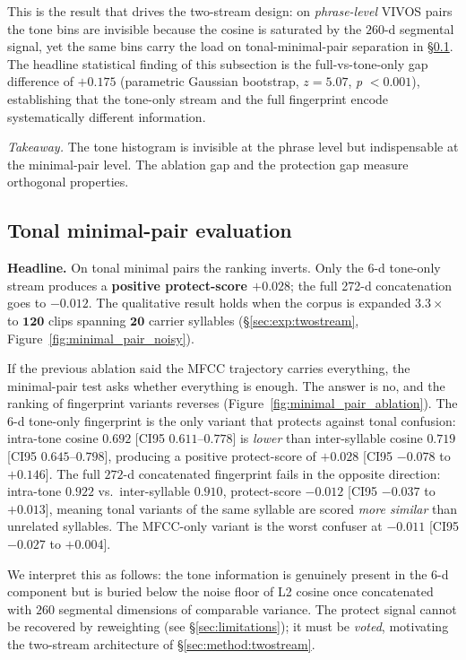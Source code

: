 \documentclass[a4paper,fleqn]{cas-dc}
\begin{document}
This is the result that drives the two-stream design: on \emph{phrase-level} VIVOS pairs the tone bins are invisible because the cosine is saturated by the $260$-d segmental signal, yet the same bins carry the load on tonal-minimal-pair separation in \S\ref{sec:exp:minpair}. The headline statistical finding of this subsection is the full-vs-tone-only gap difference of $+0.175$ (parametric Gaussian bootstrap, $z = 5.07$, \textit{p} $< 0.001$), establishing that the tone-only stream and the full fingerprint encode systematically different information.

\noindent\textit{Takeaway.} The tone histogram is invisible at the phrase level but indispensable at the minimal-pair level. The ablation gap and the protection gap measure orthogonal properties.

\subsection{Tonal minimal-pair evaluation}\label{sec:exp:minpair}
\textbf{Headline.} On tonal minimal pairs the ranking inverts. Only the 6-d tone-only stream produces a \textbf{positive protect-score $+0.028$}; the full 272-d concatenation goes to $-0.012$. The qualitative result holds when the corpus is expanded $\mathbf{3.3\times}$ to $\mathbf{120}$ clips spanning $\mathbf{20}$ carrier syllables (\S\ref{sec:exp:twostream}, Figure~\ref{fig:minimal_pair_noisy}).

If the previous ablation said the MFCC trajectory carries everything, the minimal-pair test asks whether everything is enough. The answer is no, and the ranking of fingerprint variants reverses (Figure~\ref{fig:minimal_pair_ablation}). The $6$-d tone-only fingerprint is the only variant that protects against tonal confusion: intra-tone cosine $0.692$ [CI95 $0.611$--$0.778$] is \emph{lower} than inter-syllable cosine $0.719$ [CI95 $0.645$--$0.798$], producing a positive protect-score of \textbf{$+0.028$} [CI95 $-0.078$ to $+0.146$]. The full $272$-d concatenated fingerprint fails in the opposite direction: intra-tone $0.922$ vs.\ inter-syllable $0.910$, protect-score $-0.012$ [CI95 $-0.037$ to $+0.013$], meaning tonal variants of the same syllable are scored \emph{more similar} than unrelated syllables. The MFCC-only variant is the worst confuser at $-0.011$ [CI95 $-0.027$ to $+0.004$].

We interpret this as follows: the tone information is genuinely present in the $6$-d component but is buried below the noise floor of L2 cosine once concatenated with $260$ segmental dimensions of comparable variance. The protect signal cannot be recovered by reweighting (see \S\ref{sec:limitations}); it must be \emph{voted}, motivating the two-stream architecture of \S\ref{sec:method:twostream}.
\end{document}
